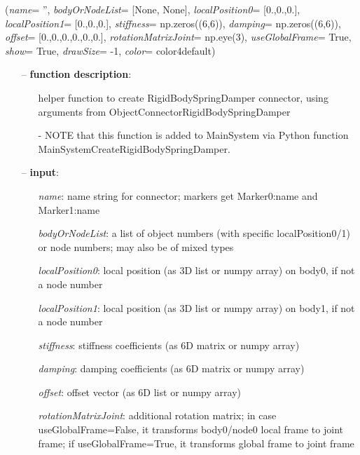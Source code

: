 %
\begin{flushleft}
\label{sec:mainsystemextensions:CreateRigidBodySpringDamper}
({\it name}= '', {\it bodyOrNodeList}= [None, None], {\it localPosition0}= [0.,0.,0.], {\it localPosition1}= [0.,0.,0.], {\it stiffness}= np.zeros((6,6)), {\it damping}= np.zeros((6,6)), {\it offset}= [0.,0.,0.,0.,0.,0.], {\it rotationMatrixJoint}= np.eye(3), {\it useGlobalFrame}= True, {\it show}= True, {\it drawSize}= -1, {\it color}= color4default)
\end{flushleft}
\setlength{\itemindent}{0.7cm}
\begin{itemize}[leftmargin=0.7cm]
\item[--]
{\bf function description}: \vspace{-6pt}
\begin{itemize}[leftmargin=1.2cm]
\setlength{\itemindent}{-0.7cm}
\item[]helper function to create RigidBodySpringDamper connector, using arguments from ObjectConnectorRigidBodySpringDamper
\item[]- NOTE that this function is added to MainSystem via Python function MainSystemCreateRigidBodySpringDamper.
\end{itemize}
\item[--]
{\bf input}: \vspace{-6pt}
\begin{itemize}[leftmargin=1.2cm]
\setlength{\itemindent}{-0.7cm}
\item[]{\it name}: name string for connector; markers get Marker0:name and Marker1:name
\item[]{\it bodyOrNodeList}: a list of object numbers (with specific localPosition0/1) or node numbers; may also be of mixed types
\item[]{\it localPosition0}: local position (as 3D list or numpy array) on body0, if not a node number
\item[]{\it localPosition1}: local position (as 3D list or numpy array) on body1, if not a node number
\item[]{\it stiffness}: stiffness coefficients (as 6D matrix or numpy array)
\item[]{\it damping}: damping coefficients (as 6D matrix or numpy array)
\item[]{\it offset}: offset vector (as 6D list or numpy array)
\item[]{\it rotationMatrixJoint}: additional rotation matrix; in case  useGlobalFrame=False, it transforms body0/node0 local frame to joint frame; if useGlobalFrame=True, it transforms global frame to joint frame

\end{itemize}
\end{itemize}
